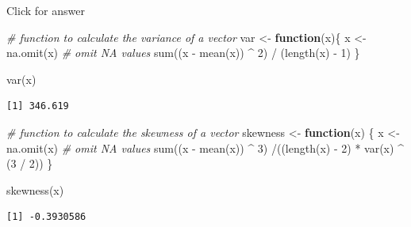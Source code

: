 \documentclass[
]{book}
\newenvironment{Shaded}{\begin{snugshade}}{\end{snugshade}}
\newcommand{\CommentTok}[1]{\textcolor[rgb]{0.56,0.35,0.01}{\textit{#1}}}
\newcommand{\ControlFlowTok}[1]{\textcolor[rgb]{0.13,0.29,0.53}{\textbf{#1}}}
\newcommand{\DecValTok}[1]{\textcolor[rgb]{0.00,0.00,0.81}{#1}}
\newcommand{\FunctionTok}[1]{\textcolor[rgb]{0.00,0.00,0.00}{#1}}
\newcommand{\NormalTok}[1]{#1}
\newcommand{\OtherTok}[1]{\textcolor[rgb]{0.56,0.35,0.01}{#1}}
\newcommand{\SpecialCharTok}[1]{\textcolor[rgb]{0.00,0.00,0.00}{#1}}
\begin{document}
Click for answer

\begin{Shaded}
\begin{Highlighting}[]
\CommentTok{\# function to calculate the variance of a vector}
\NormalTok{var }\OtherTok{\textless{}{-}} \ControlFlowTok{function}\NormalTok{(x)\{}
\NormalTok{  x }\OtherTok{\textless{}{-}} \FunctionTok{na.omit}\NormalTok{(x) }\CommentTok{\# omit NA values}
  \FunctionTok{sum}\NormalTok{((x }\SpecialCharTok{{-}} \FunctionTok{mean}\NormalTok{(x)) }\SpecialCharTok{\^{}} \DecValTok{2}\NormalTok{) }\SpecialCharTok{/}\NormalTok{ (}\FunctionTok{length}\NormalTok{(x) }\SpecialCharTok{{-}} \DecValTok{1}\NormalTok{)}
\NormalTok{\}}
\end{Highlighting}
\end{Shaded}

\begin{Shaded}
\begin{Highlighting}[]
\FunctionTok{var}\NormalTok{(x)}
\end{Highlighting}
\end{Shaded}

\begin{verbatim}
[1] 346.619
\end{verbatim}

\begin{Shaded}
\begin{Highlighting}[]
\CommentTok{\# function to calculate the skewness of a vector}
\NormalTok{skewness }\OtherTok{\textless{}{-}} \ControlFlowTok{function}\NormalTok{(x) \{}
\NormalTok{  x }\OtherTok{\textless{}{-}} \FunctionTok{na.omit}\NormalTok{(x) }\CommentTok{\# omit NA values}
  \FunctionTok{sum}\NormalTok{((x }\SpecialCharTok{{-}} \FunctionTok{mean}\NormalTok{(x)) }\SpecialCharTok{\^{}} \DecValTok{3}\NormalTok{) }\SpecialCharTok{/}\NormalTok{((}\FunctionTok{length}\NormalTok{(x) }\SpecialCharTok{{-}} \DecValTok{2}\NormalTok{) }\SpecialCharTok{*} \FunctionTok{var}\NormalTok{(x) }\SpecialCharTok{\^{}}\NormalTok{ (}\DecValTok{3} \SpecialCharTok{/} \DecValTok{2}\NormalTok{))}
\NormalTok{\}}
\end{Highlighting}
\end{Shaded}

\begin{Shaded}
\begin{Highlighting}[]
\FunctionTok{skewness}\NormalTok{(x)}
\end{Highlighting}
\end{Shaded}

\begin{verbatim}
[1] -0.3930586
\end{verbatim}
\end{document}
